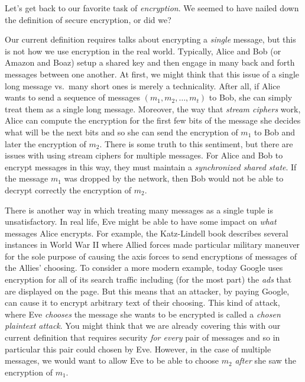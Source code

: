 Let's get back to our favorite task of \emph{encryption}. We seemed to
have nailed down the definition of secure encryption, or did we?


Our current definition requires talks about encrypting a \emph{single}
message, but this is not how we use encryption in the real world.
Typically, Alice and Bob (or Amazon and Boaz) setup a shared key and
then engage in many back and forth messages between one another. At
first, we might think that this issue of a single long message vs.~many
short ones is merely a technicality. After all, if Alice wants to send a
sequence of messages \((m_1,m_2,\ldots,m_t)\) to Bob, she can simply
treat them as a single long message. Moreover, the way that \emph{stream
ciphers} work, Alice can compute the encryption for the first few bits
of the message she decides what will be the next bits and so she can
send the encryption of \(m_1\) to Bob and later the encryption of
\(m_2\). There is some truth to this sentiment, but there are issues
with using stream ciphers for multiple messages. For Alice and Bob to
encrypt messages in this way, they must maintain a \emph{synchronized
shared state}. If the message \(m_1\) was dropped by the network, then
Bob would not be able to decrypt correctly the encryption of \(m_2\).

There is another way in which treating many messages as a single tuple
is unsatisfactory. In real life, Eve might be able to have some impact
on \emph{what} messages Alice encrypts. For example, the Katz-Lindell
book describes several instances in World War II where Allied forces
made particular military maneuver for the sole purpose of causing the
axis forces to send encryptions of messages of the Allies' choosing. To
consider a more modern example, today Google uses encryption for all of
its search traffic including (for the most part) the \emph{ads} that are
displayed on the page. But this means that an attacker, by paying
Google, can cause it to encrypt arbitrary text of their choosing. This
kind of attack, where Eve \emph{chooses} the message she wants to be
encrypted is called a \emph{chosen plaintext attack}. You might think
that we are already covering this with our current definition that
requires security \emph{for every} pair of messages and so in particular
this pair could chosen by Eve. However, in the case of multiple
messages, we would want to allow Eve to be able to choose \(m_2\)
\emph{after} she saw the encryption of \(m_1\).


